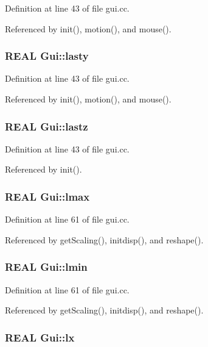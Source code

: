 Definition at line 43 of file gui.cc.

Referenced by init(), motion(), and mouse().\hypertarget{namespaceGui_0a1d9c5f437e332539fd6a9059ab2e54}{
\subsubsection[{lasty}]{\setlength{\rightskip}{0pt plus 5cm}REAL {\bf Gui::lasty}}}
\label{namespaceGui_0a1d9c5f437e332539fd6a9059ab2e54}




Definition at line 43 of file gui.cc.

Referenced by init(), motion(), and mouse().\hypertarget{namespaceGui_47745f43ef1ca3e88dc4afb80e7d2f7e}{
\subsubsection[{lastz}]{\setlength{\rightskip}{0pt plus 5cm}REAL {\bf Gui::lastz}}}
\label{namespaceGui_47745f43ef1ca3e88dc4afb80e7d2f7e}




Definition at line 43 of file gui.cc.

Referenced by init().\hypertarget{namespaceGui_ac727ddae788cc92ec47a42a42c624c1}{
\subsubsection[{lmax}]{\setlength{\rightskip}{0pt plus 5cm}REAL {\bf Gui::lmax}}}
\label{namespaceGui_ac727ddae788cc92ec47a42a42c624c1}




Definition at line 61 of file gui.cc.

Referenced by getScaling(), initdisp(), and reshape().\hypertarget{namespaceGui_56c94fbda09f27d64aa2e60813b5c72f}{
\subsubsection[{lmin}]{\setlength{\rightskip}{0pt plus 5cm}REAL {\bf Gui::lmin}}}
\label{namespaceGui_56c94fbda09f27d64aa2e60813b5c72f}




Definition at line 61 of file gui.cc.

Referenced by getScaling(), initdisp(), and reshape().\hypertarget{namespaceGui_29647b3a241e0ba782e3be2e6e328af2}{
\subsubsection[{lx}]{\setlength{\rightskip}{0pt plus 5cm}REAL {\bf Gui::lx}}}
\label{namespaceGui_29647b3a241e0ba782e3be2e6e328af2}




